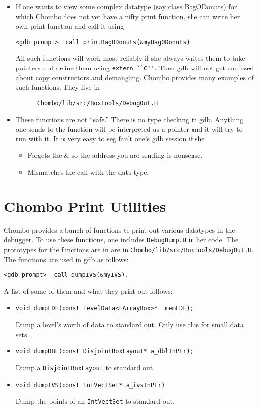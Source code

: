 \begin{itemize}
\item If one wants to view some complex datatype 
     (say class BagODonuts) for which Chombo 
      does not yet have a nifty print function, she can write her
      own print function and call it using
\begin{verbatim}
<gdb prompt>  call printBagODonuts(&myBagODonuts)
\end{verbatim}
      All such functions will work most reliably if she always
      writes them to take pointers and define them using
      \verb/extern ``C''/.  Then gdb will not get confused
      about copy constructors and demangling.  Chombo provides 
      many examples of such functions.  They live in 
\begin{verbatim}
      Chombo/lib/src/BoxTools/DebugOut.H
\end{verbatim}

\item These functions are not ``safe.''    There is
no type checking in gdb.  Anything one sends to the function
will be interpreted as a pointer and it will try to run with it.
It is very easy to seg fault one's gdb session if she
\begin{itemize}
\item Forgets the {\&} so the address you are sending is 
nonsense.
\item Mismatches the call with the data type.
\end{itemize}
\end{itemize}

\section{Chombo Print Utilities}

Chombo provides a bunch of functions to print out various
datatypes in the debugger.  To use these functions, one includes
{\tt DebugDump.H} in her code.  The prototypes for the functions
are in are in {\tt Chombo/lib/src/BoxTools/DebugOut.H}.  The functions 
are used in gdb as follows:
\begin{verbatim}
<gdb prompt>  call dumpIVS(&myIVS).
\end{verbatim}
A list of some of them and what they print out follows:
\begin{itemize}
\item \begin{verbatim}
void dumpLDF(const LevelData<FArrayBox>*  memLDF);
\end{verbatim}
 Dump a level's worth of data to standard out.   Only use
 this for small data sets.
\item \begin{verbatim}
void dumpDBL(const DisjointBoxLayout* a_dblInPtr);
\end{verbatim}
Dump a {\tt DisjointBoxLayout} to standard out.
\item \begin{verbatim}
void dumpIVS(const IntVectSet* a_ivsInPtr)
\end{verbatim}
Dump the points of an {\tt IntVectSet} to standard out.
\end{itemize}



